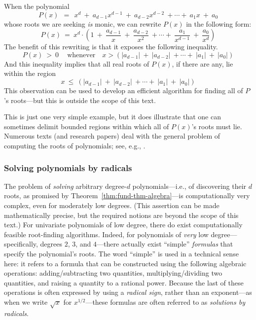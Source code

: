 \smallskip

When the polynomial
\[ P(x) \ \ = \ \ x^d \ + \ a_{d-1} x^{d-1} \ + \ a_{d-2} x^{d-2} \ + \cdots + \ a_1 x \ + \ a_0 \]
whose roots we are seeking {\em is} monic, we can rewrite $P(x)$ in the following form:
\[ P(x) \ = \ 
x^d \cdot \left( 1 \ + \ \frac{a_{d-1}}{x} \ + \ \frac{a_{d-2}}{x^2} \ + \cdots + \ \frac{a_1}{x^{d-1}} \ + \ \frac{a_0}{x^d} \right)
\]
The benefit of this rewriting is that it exposes the following inequality.
\begin{equation}
\label{eq;bound-monic-roots}
P(x) \ > \ 0 \ \ \ \ \mbox{ whenever } \ \ \ x >
 \left(|a_{d-1}| \ + \ |a_{d-2}| \ + \cdots + \ |a_1| \ + \ |a_0| \right)
\end{equation}
And this inequality implies that all real roots of $P(x)$, if there are any, lie within the region
\[ x \ \leq \ \left(|a_{d-1}| \ + \ |a_{d-2}| \ + \cdots + \ |a_1| \ + \ |a_0| \right) \]
This observation can be used to develop an efficient algorithm for finding all of $P$'s roots---but this is outside the scope of this text.

\medskip

This is just one very simple example, but it does illustrate that one can sometimes delimit bounded regions within which all of $P(x)$'s roots must lie.  Numerous texts (and research papers) deal with the general problem of computing the roots of polynomials; see, e.g., \cite{MacDuffee}.


\subsubsection{Solving polynomials by radicals}
\label{sec:poly-by-radical}

The problem of {\it solving} arbitrary degree-$d$ polynomials---i.e.,
of discovering their $d$ roots, as promised by
Theorem~\ref{thm:fund-thm-algebra}---is computationally very complex,
even for moderately low degrees.  (This assertion can be made
mathematically precise, but the required notions are beyond the scope
of this text.)  For univariate polynomials of low degree, there do
exist computationally feasible root-finding algorithms.  Indeed, for
polynomials of {\em very} low degree---specifically, degrees $2$, $3$,
and $4$---there actually exist ``simple'' {\em formulas} that specify
the polynomial's roots.  The word ``simple'' is used in a technical
sense here: it refers to a formula that can be constructed using the
following algebraic operations: adding/subtracting two quantities,
multiplying/dividing two quantities, and raising a quantity to a
rational power.  Because the last of these operations is often
expressed by using a {\em radical sign}, rather than an exponent---as
when we write $\sqrt{x}$ for $x^{1/2}$---these formulas are often
referred to as {\it solutions by radicals}.

